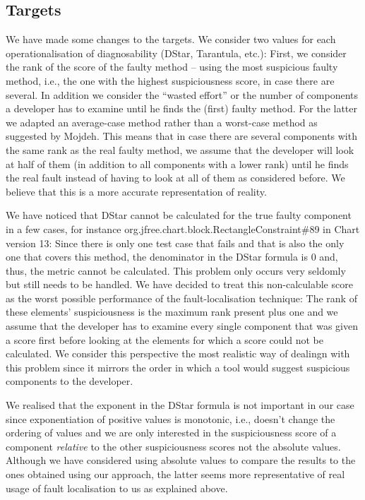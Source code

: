 \documentclass{scrartcl}
\begin{document}
\subsection{Targets}

We have made some changes to the targets. We consider two values for each
operationalisation of diagnosability (DStar, Tarantula, etc.): First, we
consider the rank of the score of the faulty method -- using the most suspicious
faulty method, i.e., the one with the highest suspiciousness score, in case
there are several. In addition we consider the \enquote{wasted effort} or the
number of components a developer has to examine until he finds the (first)
faulty method. For the latter we adapted an average-case method rather than a
worst-case method as suggested by Mojdeh. This means that in case there are
several components with the same rank as the real faulty method, we assume that
the developer will look at half of them (in addition to all components with a
lower rank) until he finds the real fault instead of having to look at all of
them as considered before. We believe that this is a more accurate
representation of reality.

We have noticed that DStar cannot be calculated for the true faulty component in
a few cases, for instance org.jfree.chart.block.RectangleConstraint\#89 in Chart
version 13: Since there is only one test case that fails and that is also the
only one that covers this method, the denominator in the DStar formula is 0 and,
thus, the metric cannot be calculated. This problem only occurs very seldomly
but still needs to be handled. We have decided to treat this non-calculable
score as the worst possible performance of the fault-localisation technique: The
rank of these elements' suspiciousness is the maximum rank present plus one and
we assume that the developer has to examine every single component that was
given a score first before looking at the elements for which a score could not
be calculated. We consider this perspective the most realistic way of dealingn
with this problem since it mirrors the order in which a tool would suggest
suspicious components to the developer.

We realised that the exponent in the DStar formula is not important in our case
since exponentiation of positive values is monotonic, i.e., doesn't change the
ordering of values and we are only interested in the suspiciousness score of a
component \emph{relative} to the other suspiciousness scores not the absolute
values. Although we have considered using absolute values to compare the results
to the ones obtained using our approach, the latter seems more representative of
real usage of fault localisation to us as explained above. 
\end{document}
